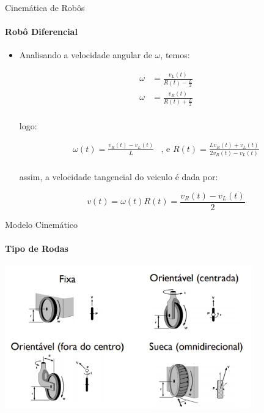\documentclass{beamer}
\begin{document}
\begin{frame}{Cinemática de Robôs}
    \framesubtitle{Robô Diferencial}

    \begin{itemize}
        \item Analisando a velocidade angular de $\omega$, temos:
    
        \begin{equation*}
            \begin{split}
                \omega & = \frac{v_L(t)}{R(t)-\frac{L}{2}} \\
                \omega & = \frac{v_R(t)}{R(t)+\frac{L}{2}} \\
            \end{split}
        \end{equation*}

        logo:

        \begin{equation*}
            \begin{split}
                \boxed{\omega (t) = \frac{ v_R(t) - v_L(t)}{L}} & \text{, e }
                \boxed{R(t)  = \frac{L v_R(t) + v_L(t)}{2 v_R(t) - v_L(t)}} \\
            \end{split}
        \end{equation*}

        assim, a velocidade tangencial do veiculo é dada por:

        \begin{equation}
                v (t) =\omega (t) R(t) = \frac{ v_R(t) - v_L(t)}{2}
        \end{equation}

    \end{itemize}

\end{frame}



\begin{frame}{Modelo Cinemático}
    \framesubtitle{Tipo de Rodas}
    \begin{center}
        \includegraphics[width=0.8\textwidth]{images/tipo_de_rodas.png}
    \end{center}
\end{frame}
\end{document}
